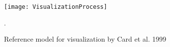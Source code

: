 \begin{figure}[t]
  \texttt{[image: VisualizationProcess]}
  \caption[Reference model for visualization]{Reference model for visualization by Card et al. 1999 \cite{card_readings_1999}}.
  \label{fig:vizprocess}
  \centering
\end{figure}